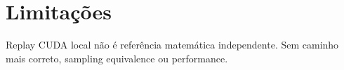 \section{Limitações}
Replay CUDA local não é referência matemática independente. Sem caminho mais correto, sampling equivalence ou performance.

